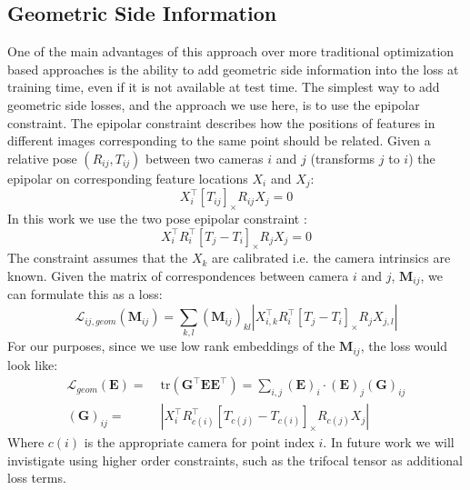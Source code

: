 \documentclass[10pt,twocolumn,letterpaper]{article}
\newcommand{\mat}[1]{\mathbf{#1}}
\newcommand{\cross}[1]{[#1]_{\times}}
\begin{document}
\subsection{Geometric Side Information}
One of the main advantages of this approach over more traditional optimization based approaches is the ability to add geometric side information into the loss at training time, even if it is not available at test time.
The simplest way to add geometric side losses, and the approach we use here, is to use the epipolar constraint.
The epipolar constraint describes how the positions of features in different images corresponding to the same point should be related.
Given a relative pose $(R_{ij}, T_{ij})$ between two cameras $i$ and $j$  (transforms $j$ to $i$) the epipolar on corresponding feature locations $X_i$ and $X_j$:
\begin{equation}
X_{i}^\top \cross{T_{ij}}R_{ij} X_{j} = 0
\label{eq:essential_constraint_rel}
\end{equation}
In this work we use the two pose epipolar constraint \cite{tron2014quotient}:
\begin{equation}
X_{i}^\top R_{i}^\top \cross{T_{j} - T_{i}}R_{j} X_{j} = 0
\label{eq:essential_constraint}
\end{equation}
The constraint assumes that the $X_k$ are calibrated i.e. the camera intrinsics are known. 
Given the matrix of correspondences between camera $i$ and $j$, $\mat{M}_{ij}$, we can formulate this as a loss:
\begin{equation}
\mathcal{L}_{ij,geom}(\mat{M}_{ij}) = \sum_{k,l} (\mat{M}_{ij})_{kl} \left|X_{i,k}^\top R_{i}^\top \cross{T_{j} - T_{i}}R_{j} X_{j,l}\right|
\label{eq:geom_cost}
\end{equation}
For our purposes, since we use low rank embeddings of the $\mat{M}_{ij}$, the loss would look like:
\begin{align}
\mathcal{L}_{geom}(\mat{E})
=&\; \mathrm{tr}(\mat{G}^\top \mat{E}\mat{E}^\top) = \sum_{i,j} (\mat{E})_{i} \cdot (\mat{E})_{j} (\mat{G})_{ij} \\
(\mat{G})_{ij} =&\; \left|X_{i}^\top R_{c(i)}^\top \cross{T_{c(j)} - T_{c(i)}}R_{c(j)} X_{j}\right| \nonumber
\label{eq:geom_cost2}
\end{align}
Where $c(i)$ is the appropriate camera for point index $i$.
In future work we will invistigate using higher order constraints, such as the trifocal tensor as additional loss terms.
\end{document}
